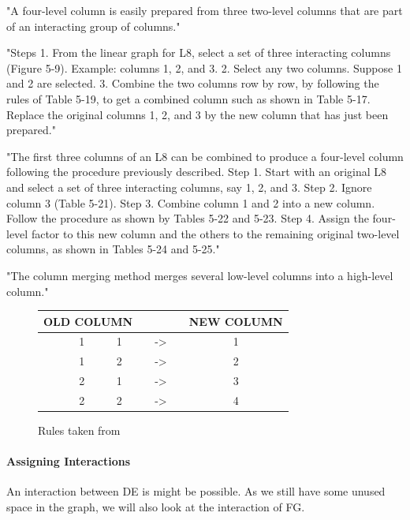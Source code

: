 "A four-level column is easily prepared from three two-level columns that are part of an interacting group of columns."\cite{roy_primer_1990}

"Steps 1. From the linear graph for L8, select a set of three interacting columns (Figure 5-9). Example: columns 1, 2, and 3. 2. Select any two columns. Suppose 1 and 2 are selected. 3. Combine the two columns row by row, by following the rules of Table 5-19, to get a combined column such as shown in Table 5-17. Replace the original columns 1, 2, and 3 by the new column that has just been prepared."\cite{roy_primer_1990}

"The first three columns of an L8 can be combined to produce a four-level column following the procedure previously described. Step 1. Start with an original L8 and select a set of three interacting columns, say 1, 2, and 3. Step 2. Ignore column 3 (Table 5-21). Step 3. Combine column 1 and 2 into a new column. Follow the procedure as shown by Tables 5-22 and 5-23. Step 4. Assign the four-level factor to this new column and the others to the remaining original two-level columns, as shown in Tables 5-24 and 5-25."\cite{roy_primer_1990}


"The column merging method merges several low-level columns into a high-level column."\cite{yang_design_2009}


\begin{figure}[H]
	\centering
	\begin{tabular}{ |ccccccc|  }
		\hline
		\multicolumn{3}{|c}{ OLD COLUMN } & & & & NEW COLUMN \\
		\hline
		& 1 & 1 & & -> & & 1\\
		& 1 & 2 & & -> & & 2\\
		& 2 & 1 & & -> & & 3\\
		& 2 & 2 & & -> & & 4\\
		\hline
	\end{tabular}
	\caption{Rules taken from \cite{roy_primer_1990}}
	\label{table:hyperparameter_tuning:merging_rules}
\end{figure}

\paragraph{Assigning Interactions}
An interaction between DE is might be possible. As we still have some unused space in the graph, we will also look at the interaction of FG. 


